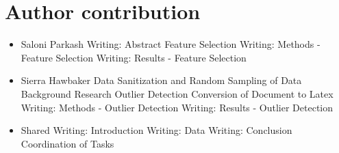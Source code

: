 \documentclass[article,pdftex,10pt,a4paper,twocolumn]{article}
\begin{document}
\section*{Author contribution}


\begin{itemize}
 \item Saloni Parkash
 \subitem Writing: Abstract
 \subitem Feature Selection
 \subitem Writing: Methods - Feature Selection
 \subitem Writing: Results - Feature Selection
 \item Sierra Hawbaker
 \subitem Data Sanitization and Random Sampling of Data
 \subitem Background Research
 \subitem Outlier Detection
 \subitem Conversion of Document to Latex
 \subitem Writing: Methods - Outlier Detection
 \subitem Writing: Results - Outlier Detection
 \item Shared
 \subitem Writing: Introduction
 \subitem Writing: Data
 \subitem Writing: Conclusion
 \subitem Coordination of Tasks
\end{itemize}





\end{document}
